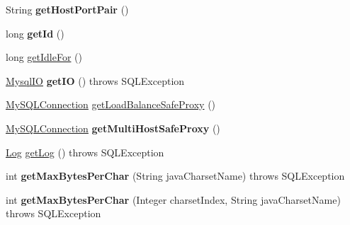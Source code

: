 \begin{DoxyCompactItemize}
String {\bfseries get\+Host\+Port\+Pair} ()
\item 
\mbox{\label{classcom_1_1mysql_1_1jdbc_1_1_multi_host_my_s_q_l_connection_a68c34f914628be14334f5e74208adc9a}} 
long {\bfseries get\+Id} ()
\item 
long \mbox{\hyperlink{classcom_1_1mysql_1_1jdbc_1_1_multi_host_my_s_q_l_connection_a599b45b496d131fc0a7e56c867bbb3b0}{get\+Idle\+For}} ()
\item 
\mbox{\label{classcom_1_1mysql_1_1jdbc_1_1_multi_host_my_s_q_l_connection_aa6ffd75abf0817a6f3ada3f32bbb8ee4}} 
\mbox{\hyperlink{classcom_1_1mysql_1_1jdbc_1_1_mysql_i_o}{Mysql\+IO}} {\bfseries get\+IO} ()  throws S\+Q\+L\+Exception 
\item 
\mbox{\hyperlink{interfacecom_1_1mysql_1_1jdbc_1_1_my_s_q_l_connection}{My\+S\+Q\+L\+Connection}} \mbox{\hyperlink{classcom_1_1mysql_1_1jdbc_1_1_multi_host_my_s_q_l_connection_ad7893fe96d0aaafec04050c268d5fb44}{get\+Load\+Balance\+Safe\+Proxy}} ()
\item 
\mbox{\label{classcom_1_1mysql_1_1jdbc_1_1_multi_host_my_s_q_l_connection_a18460b3a81efe2d743e4ab174fecd7b3}} 
\mbox{\hyperlink{interfacecom_1_1mysql_1_1jdbc_1_1_my_s_q_l_connection}{My\+S\+Q\+L\+Connection}} {\bfseries get\+Multi\+Host\+Safe\+Proxy} ()
\item 
\mbox{\hyperlink{interfacecom_1_1mysql_1_1jdbc_1_1log_1_1_log}{Log}} \mbox{\hyperlink{classcom_1_1mysql_1_1jdbc_1_1_multi_host_my_s_q_l_connection_aa844db76fbc95ba7a185cf4df1257800}{get\+Log}} ()  throws S\+Q\+L\+Exception 
\item 
\mbox{\label{classcom_1_1mysql_1_1jdbc_1_1_multi_host_my_s_q_l_connection_ae1c464a5226007cdf14b771d1ddf1625}} 
int {\bfseries get\+Max\+Bytes\+Per\+Char} (String java\+Charset\+Name)  throws S\+Q\+L\+Exception 
\item 
\mbox{\label{classcom_1_1mysql_1_1jdbc_1_1_multi_host_my_s_q_l_connection_a0459df653b2ec791c0b32e77420839ad}} 
int {\bfseries get\+Max\+Bytes\+Per\+Char} (Integer charset\+Index, String java\+Charset\+Name)  throws S\+Q\+L\+Exception 

\end{DoxyCompactItemize}

